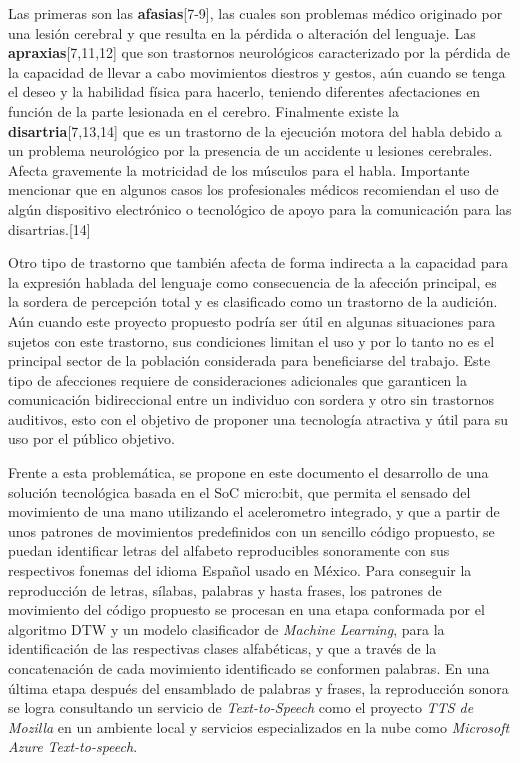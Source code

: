 \hfill \break
\justifying
Las primeras son las \textbf{afasias}[7-9], las cuales son problemas médico originado por una lesión cerebral y que resulta en la pérdida o alteración del lenguaje.  Las \textbf{apraxias}[7,11,12] que son trastornos neurológicos caracterizado por la pérdida de la capacidad de llevar a cabo movimientos diestros y gestos, aún cuando se tenga el deseo y la habilidad física para hacerlo, teniendo diferentes afectaciones en función de la parte lesionada en el cerebro. Finalmente existe la \textbf{disartria}[7,13,14] que es un trastorno de la ejecución motora del habla debido a un problema neurológico por la presencia de un accidente u lesiones cerebrales. Afecta gravemente la motricidad de los músculos para el habla. Importante mencionar que en algunos casos los profesionales médicos recomiendan el uso de algún dispositivo electrónico o tecnológico de apoyo para la comunicación para las disartrias.[14]

\hfill \break
\justifying
Otro tipo de trastorno que también afecta de forma indirecta a la capacidad para la expresión hablada del lenguaje como consecuencia de la afección principal, es la sordera de percepción total y es clasificado como un trastorno de la audición. Aún cuando este proyecto propuesto podría ser útil en algunas situaciones para sujetos con este trastorno, sus condiciones limitan el uso y por lo tanto no es el principal sector de la población considerada para beneficiarse del trabajo. Este tipo de afecciones requiere de consideraciones adicionales que garanticen la comunicación bidireccional entre un individuo con sordera y otro sin trastornos auditivos, esto con el objetivo de proponer una tecnología atractiva y útil para su uso por el público objetivo.

\hfill \break
\justifying
Frente a esta problemática, se propone en este documento el desarrollo de una solución tecnológica basada en el SoC micro:bit, que permita el sensado del movimiento de una mano utilizando el acelerometro integrado, y que a partir de unos patrones de movimientos predefinidos con un sencillo código propuesto, se puedan identificar letras del alfabeto reproducibles sonoramente con sus respectivos fonemas del idioma Español usado en México.
Para conseguir la reproducción de letras, sílabas, palabras y hasta frases, los patrones de movimiento del código propuesto se procesan en una etapa conformada por el algoritmo DTW y un modelo clasificador de \textit{Machine Learning}, para la identificación de las respectivas clases alfabéticas, y que a través de la concatenación de cada movimiento identificado se conformen palabras. En una última etapa después del ensamblado de palabras y frases, la reproducción sonora se logra consultando un servicio de \textit{Text-to-Speech} como el proyecto \textit{TTS de Mozilla} en un ambiente local y servicios especializados en la nube como \textit{Microsoft Azure Text-to-speech}.

